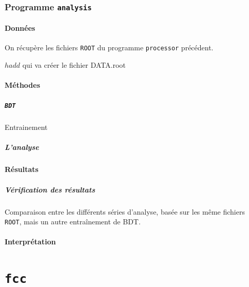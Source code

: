 \documentclass[10pt,a4paper]{report}
\newcommand{\ROOT}{\texttt{ROOT}\xspace}
\newcommand{\processor}{\texttt{processor}\xspace}
\newcommand{\analysis}{\texttt{analysis}\xspace}
\begin{document}
\section{Programme \analysis}

\subsection{Données}

On récupère les fichiers \ROOT du programme \processor précédent. 

$ hadd $ qui va créer le fichier DATA.root

\subsection{Méthodes}

\subsubsection{\texttt{BDT}}

Entrainement

\subsubsection{L'analyse}



\subsection{Résultats}

\subsubsection{Vérification des résultats}
Comparaison entre les différents séries d'analyse, basée sur les même fichiers \ROOT, mais un autre entraînement de BDT.

\subsection{Interprétation}

\part{\texttt{fcc}}
\end{document}
